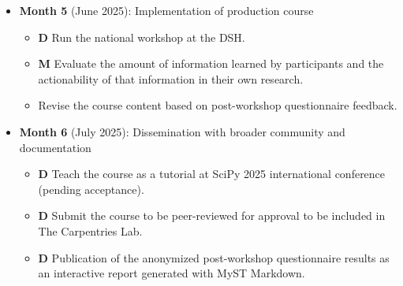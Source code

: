 \documentclass[letterpaper, 11pt]{article}
\newcommand{\milestone}{\textbf{\textrm{M}}}
\newcommand{\deliverable}{\textbf{\textrm{D}}}
\begin{document}
\begin{itemize}
  \item \textbf{Month 5} (June 2025): Implementation of production course
    \begin{itemize}
      \item \deliverable{} Run the national workshop at the DSH.
      \item \milestone{} Evaluate the amount of information learned by participants and the actionability of that information in their own research.
      \item Revise the course content based on post-workshop questionnaire feedback.
    \end{itemize}
  \item \textbf{Month 6} (July 2025): Dissemination with broader community and documentation
    \begin{itemize}
      \item \deliverable{} Teach the course as a tutorial at SciPy 2025 international conference (pending acceptance).
      \item \deliverable{} Submit the course to be peer-reviewed for approval to be included in The Carpentries Lab.
      \item \deliverable{} Publication of the anonymized post-workshop questionnaire results as an interactive report generated with MyST Markdown.
    \end{itemize}
\end{itemize}

\clearpage
%
\vspace*{-0.25cm}
\begin{footnotesize}
%
 
 
%
\end{footnotesize}
\end{document}
